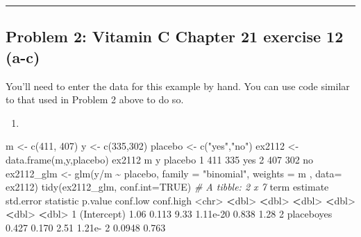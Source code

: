 \documentclass[
]{article}
\newenvironment{Shaded}{\begin{snugshade}}{\end{snugshade}}
\newcommand{\AttributeTok}[1]{\textcolor[rgb]{0.77,0.63,0.00}{#1}}
\newcommand{\CommentTok}[1]{\textcolor[rgb]{0.56,0.35,0.01}{\textit{#1}}}
\newcommand{\ConstantTok}[1]{\textcolor[rgb]{0.00,0.00,0.00}{#1}}
\newcommand{\DecValTok}[1]{\textcolor[rgb]{0.00,0.00,0.81}{#1}}
\newcommand{\ErrorTok}[1]{\textcolor[rgb]{0.64,0.00,0.00}{\textbf{#1}}}
\newcommand{\FloatTok}[1]{\textcolor[rgb]{0.00,0.00,0.81}{#1}}
\newcommand{\FunctionTok}[1]{\textcolor[rgb]{0.00,0.00,0.00}{#1}}
\newcommand{\NormalTok}[1]{#1}
\newcommand{\OtherTok}[1]{\textcolor[rgb]{0.56,0.35,0.01}{#1}}
\newcommand{\SpecialCharTok}[1]{\textcolor[rgb]{0.00,0.00,0.00}{#1}}
\newcommand{\StringTok}[1]{\textcolor[rgb]{0.31,0.60,0.02}{#1}}
\begin{document}
\begin{center}\rule{0.5\linewidth}{0.5pt}\end{center}

\hypertarget{problem-2-vitamin-c-chapter-21-exercise-12-a-c}{%
\subsection{Problem 2: Vitamin C Chapter 21 exercise 12
(a-c)}\label{problem-2-vitamin-c-chapter-21-exercise-12-a-c}}

You'll need to enter the data for this example by hand. You can use code
similar to that used in Problem 2 above to do so.

\begin{enumerate}
\def\labelenumi{\alph{enumi}.}
\item
  \newline
\end{enumerate}

\begin{Shaded}
\begin{Highlighting}[]
\NormalTok{m }\OtherTok{\textless{}{-}} \FunctionTok{c}\NormalTok{(}\DecValTok{411}\NormalTok{, }\DecValTok{407}\NormalTok{)}
\NormalTok{y }\OtherTok{\textless{}{-}} \FunctionTok{c}\NormalTok{(}\DecValTok{335}\NormalTok{,}\DecValTok{302}\NormalTok{)}
\NormalTok{placebo }\OtherTok{\textless{}{-}} \FunctionTok{c}\NormalTok{(}\StringTok{"yes"}\NormalTok{,}\StringTok{"no"}\NormalTok{)}
\NormalTok{ex2112 }\OtherTok{\textless{}{-}} \FunctionTok{data.frame}\NormalTok{(m,y,placebo)}
\NormalTok{ex2112}
\NormalTok{    m   y placebo}
\DecValTok{1} \DecValTok{411} \DecValTok{335}\NormalTok{     yes}
\DecValTok{2} \DecValTok{407} \DecValTok{302}\NormalTok{      no}
\NormalTok{ex2112\_glm }\OtherTok{\textless{}{-}} \FunctionTok{glm}\NormalTok{(y}\SpecialCharTok{/}\NormalTok{m }\SpecialCharTok{\textasciitilde{}}\NormalTok{ placebo, }\AttributeTok{family =} \StringTok{"binomial"}\NormalTok{, }\AttributeTok{weights =}\NormalTok{ m , }\AttributeTok{data=}\NormalTok{ ex2112)}
\FunctionTok{tidy}\NormalTok{(ex2112\_glm, }\AttributeTok{conf.int=}\ConstantTok{TRUE}\NormalTok{)}
\CommentTok{\# A tibble: 2 x 7}
\NormalTok{  term        estimate std.error statistic  p.value conf.low conf.high}
  \SpecialCharTok{\textless{}}\NormalTok{chr}\SpecialCharTok{\textgreater{}}          \ErrorTok{\textless{}}\NormalTok{dbl}\SpecialCharTok{\textgreater{}}     \ErrorTok{\textless{}}\NormalTok{dbl}\SpecialCharTok{\textgreater{}}     \ErrorTok{\textless{}}\NormalTok{dbl}\SpecialCharTok{\textgreater{}}    \ErrorTok{\textless{}}\NormalTok{dbl}\SpecialCharTok{\textgreater{}}    \ErrorTok{\textless{}}\NormalTok{dbl}\SpecialCharTok{\textgreater{}}     \ErrorTok{\textless{}}\NormalTok{dbl}\SpecialCharTok{\textgreater{}}
\DecValTok{1}\NormalTok{ (Intercept)    }\FloatTok{1.06}      \FloatTok{0.113}      \FloatTok{9.33} \FloatTok{1.11e{-}20}   \FloatTok{0.838}      \FloatTok{1.28} 
\DecValTok{2}\NormalTok{ placeboyes     }\FloatTok{0.427}     \FloatTok{0.170}      \FloatTok{2.51} \FloatTok{1.21}\NormalTok{e}\SpecialCharTok{{-}} \DecValTok{2}   \FloatTok{0.0948}     \FloatTok{0.763}
\end{Highlighting}
\end{Shaded}
\end{document}
